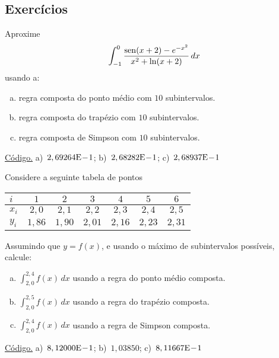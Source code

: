 \subsection*{Exercícios}

\begin{exer}\label{exer:int_comp_fun}
  Aproxime
  \begin{equation}
    \int_{-1}^0 \frac{\operatorname{sen}(x+2)-e^{-x^2}}{x^2+\ln(x+2)}\,dx
  \end{equation}
usando a:
\begin{enumerate}[a)]
\item regra composta do ponto médio com $10$ subintervalos.
\item regra composta do trapézio com $10$ subintervalos.
\item regra composta de Simpson com $10$ subintervalos.
\end{enumerate}
\end{exer}
\begin{resp}
  \ifisoctave 
  \href{https://github.com/phkonzen/notas/blob/master/src/MatematicaNumerica/cap_integr/dados/exer_int_comp_fun/exer_int_comp_fun.m}{Código.} 
  \fi
  a)~$2,69264\mathrm{E}\!-\!1$; b)~$2,68282\mathrm{E}\!-\!1$; c)~$2,68937\mathrm{E}\!-\!1$
\end{resp}

\begin{exer}\label{exer:int_comp_tab}
  Considere a seguinte tabela de pontos
  \begin{center}
    \begin{tabular}{l|cccccc}
      $i$ & $1$ & $2$ & $3$ & $4$ & $5$ & $6$ \\\hline
      $x_i$ & $2,0$ & $2,1$ & $2,2$ & $2,3$ & $2,4$ & $2,5$ \\
      $y_i$ & $1,86$ & $1,90$ & $2,01$ & $2,16$ & $2,23$ & $2,31$ \\\hline
    \end{tabular}
  \end{center}
Assumindo que $y = f(x)$, e usando o máximo de subintervalos possíveis, calcule:
\begin{enumerate}[a)]
\item $\displaystyle \int_{2,0}^{2,4} f(x)\,dx$ usando a regra do ponto médio composta.
\item $\displaystyle \int_{2,0}^{2,5} f(x)\,dx$ usando a regra do trapézio composta.
\item $\displaystyle \int_{2,0}^{2,4} f(x)\,dx$ usando a regra de Simpson composta.
\end{enumerate}
\end{exer}
\begin{resp}
  \ifisoctave 
  \href{https://github.com/phkonzen/notas/blob/master/src/MatematicaNumerica/cap_integr/dados/exer_int_comp_tab/exer_int_comp_tab.m}{Código.} 
  \fi
  a)~$8,12000\mathrm{E}\!-\!1$; b)~$1,03850$; c)~$8,11667\mathrm{E}\!-\!1$
\end{resp}

